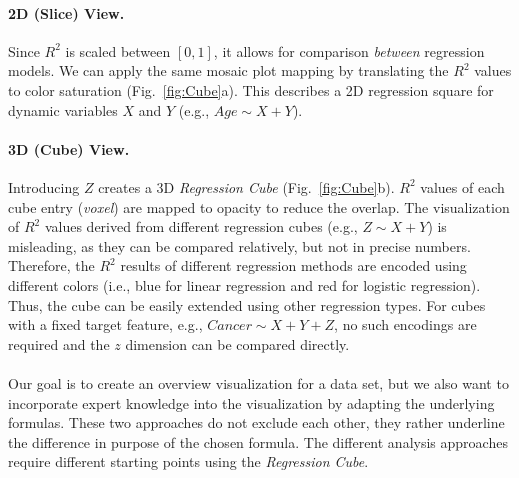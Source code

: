 \documentclass[journal]{style/vgtc} 			          %
\begin{document}
\paragraph{2D (Slice) View.}
Since $R^2$ is scaled between $[0, 1]$, it allows for comparison \emph{between} regression models.
We can apply the same mosaic plot mapping by translating the $R^2$ values to color saturation (Fig.~\ref{fig:Cube}a).
This describes a 2D regression square for dynamic variables $X$ and $Y$ (e.g., $Age \sim X + Y$).

\paragraph{3D (Cube) View.}
Introducing $Z$ creates a 3D \emph{Regression Cube} (Fig.~\ref{fig:Cube}b).
$R^2$ values of each cube entry (\emph{voxel}) are mapped to opacity to reduce the overlap.
The visualization of $R^2$ values derived from different regression cubes (e.g., $Z \sim X + Y$) is misleading, as they can be compared relatively, but not in precise numbers.
Therefore, the $R^2$ results of different regression methods are encoded using different colors (i.e., blue for linear regression and red for logistic regression).
Thus, the cube can be easily extended using other regression types.
For cubes with a fixed target feature, e.g., $Cancer \sim X + Y + Z$, no such encodings are required and the $z$ dimension can be compared directly.
\\\\
Our goal is to create an overview visualization for a data set, but we also want to incorporate expert knowledge into the visualization by adapting the underlying formulas.
These two approaches do not exclude each other, they rather underline the difference in purpose of the chosen formula.
The different analysis approaches require different starting points using the \emph{Regression Cube}.
\end{document}
